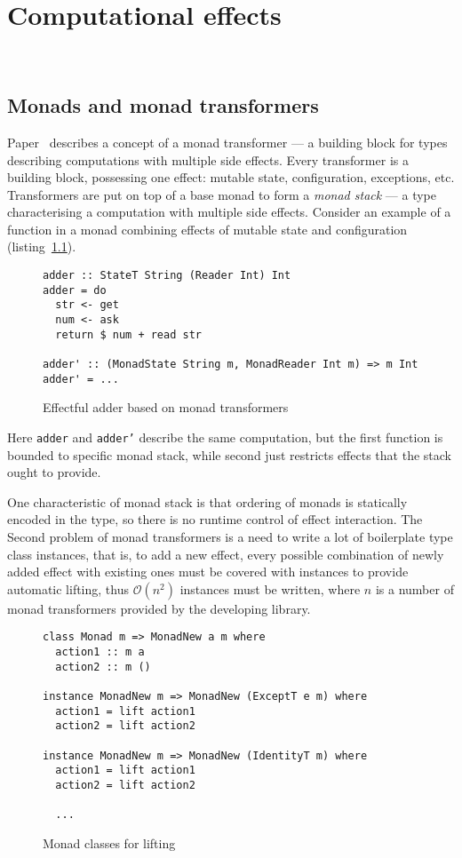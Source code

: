 \chapter{Computational effects}
~\label{cpt-effects}

  \section{Monads and monad transformers}

  Paper~\cite{Liang:1995:MTM:199448.199528} describes a concept of a monad
  transformer --- a building block for types describing computations with
  multiple side effects. Every transformer is a building block, possessing one
  effect: mutable state, configuration, exceptions, etc.
  Transformers are put on top of a base monad to form a \emph{monad stack} --- a
  type characterising a computation with multiple side effects. Consider
  an example of a function in a monad combining effects of mutable state and
  configuration (listing~\ref{listing:mtlAdder}).

  \begin{figure}[h]
  \begin{lstlisting}
adder :: StateT String (Reader Int) Int
adder = do
  str <- get
  num <- ask
  return $ num + read str

adder' :: (MonadState String m, MonadReader Int m) => m Int
adder' = ...
  \end{lstlisting}
  \caption{Effectful adder based on monad transformers}
  \label{listing:mtlAdder}
  \end{figure}

  Here \texttt{adder} and \texttt{adder'} describe the same computation, but the first
  function is bounded to specific monad stack, while second just restricts effects
  that the stack ought to provide.

  One characteristic of monad stack is that ordering of monads is statically encoded
  in the type, so there is no runtime control of effect interaction.
  The Second problem of monad transformers is a need to write a lot of boilerplate
  type class instances, that is, to add a new effect, every possible combination
  of newly added effect with existing ones must be covered with instances to provide
  automatic lifting, thus $\mathcal{O}(n^2)$ instances must be written,
  where $n$ is a number of monad transformers provided by the developing library.

  \begin{figure}[h]
  \begin{lstlisting}
class Monad m => MonadNew a m where
  action1 :: m a
  action2 :: m ()

instance MonadNew m => MonadNew (ExceptT e m) where
  action1 = lift action1
  action2 = lift action2

instance MonadNew m => MonadNew (IdentityT m) where
  action1 = lift action1
  action2 = lift action2

  ...
  \end{lstlisting}
  \caption{Monad classes for lifting}
  \label{listing:mtlLift}
  \end{figure}

